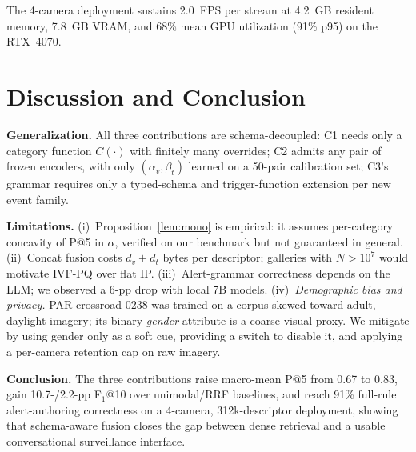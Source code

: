 ﻿\documentclass[conference]{IEEEtran}
\theoremstyle{definition}
\begin{document}
The 4-camera deployment sustains 2.0~FPS per stream at 4.2~GB resident memory, 7.8~GB VRAM, and 68\% mean GPU utilization (91\% p95) on the RTX~4070.

\section{Discussion and Conclusion}

\textbf{Generalization.} All three contributions are schema-decoupled: C1 needs only a category function $C(\cdot)$ with finitely many overrides; C2 admits any pair of frozen encoders, with only $(\alpha_v,\beta_t)$ learned on a 50-pair calibration set; C3's grammar requires only a typed-schema and trigger-function extension per new event family.

\textbf{Limitations.} (i)~Proposition~\ref{lem:mono} is empirical: it assumes per-category concavity of P@5 in $\alpha$, verified on our benchmark but not guaranteed in general. (ii)~Concat fusion costs $d_v+d_t$ bytes per descriptor; galleries with $N>10^7$ would motivate IVF-PQ over flat IP. (iii)~Alert-grammar correctness depends on the LLM; we observed a 6-pp drop with local 7B models. (iv)~\emph{Demographic bias and privacy.} PAR-crossroad-0238 was trained on a corpus skewed toward adult, daylight imagery; its binary \textit{gender} attribute is a coarse visual proxy. We mitigate by using gender only as a soft cue, providing a switch to disable it, and applying a per-camera retention cap on raw imagery.

\textbf{Conclusion.} The three contributions raise macro-mean P@5 from 0.67 to 0.83, gain 10.7-/2.2-pp F$_1$@10 over unimodal/RRF baselines, and reach 91\% full-rule alert-authoring correctness on a 4-camera, 312k-descriptor deployment, showing that schema-aware fusion closes the gap between dense retrieval and a usable conversational surveillance interface.
\end{document}
